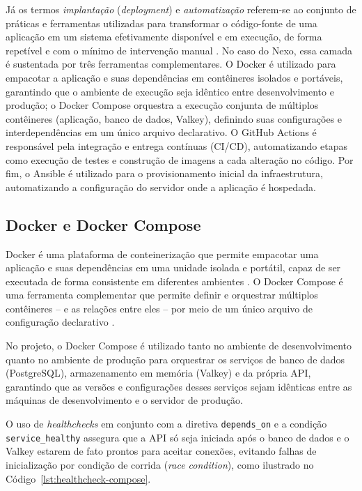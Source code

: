 Já os termos \textit{implantação} (\textit{deployment}) e
\textit{automatização} referem-se ao conjunto de práticas e ferramentas
utilizadas para transformar o código-fonte de uma aplicação em um sistema
efetivamente disponível e em execução, de forma repetível e com o mínimo de
intervenção manual \cite{Humble_Farley_2011}. No caso do Nexo, essa camada é
sustentada por três ferramentas complementares. O Docker é utilizado para
empacotar a aplicação e suas dependências em contêineres isolados e portáveis,
garantindo que o ambiente de execução seja idêntico entre desenvolvimento e
produção; o Docker Compose orquestra a execução conjunta de múltiplos
contêineres (aplicação, banco de dados, Valkey), definindo suas configurações e
interdependências em um único arquivo declarativo. O GitHub Actions é
responsável pela integração e entrega contínuas (CI/CD), automatizando
etapas como execução de testes e construção de imagens a cada alteração no
código. Por fim, o Ansible é utilizado para o provisionamento inicial da
infraestrutura, automatizando a configuração do servidor onde a aplicação é
hospedada.

\subsection{Docker e Docker Compose}

Docker é uma plataforma de conteinerização que permite empacotar uma
aplicação e suas dependências em uma unidade isolada e portátil, capaz de ser
executada de forma consistente em diferentes ambientes \citep{docker:2026}. O
Docker Compose é uma ferramenta complementar que permite definir e orquestrar
múltiplos contêineres -- e as relações entre eles -- por meio de um único
arquivo de configuração declarativo \citep{dockercompose:2026}.

No projeto, o Docker Compose é utilizado tanto no ambiente de desenvolvimento
quanto no ambiente de produção para orquestrar os serviços de banco de dados
(PostgreSQL), armazenamento em memória (Valkey) e da própria API, garantindo
que as versões e configurações desses serviços sejam idênticas entre as
máquinas de desenvolvimento e o servidor de produção.

O uso de \textit{healthchecks} em conjunto com a diretiva
\texttt{depends\_on} e a condição \texttt{service\_healthy} assegura
que a API só seja iniciada após o banco de dados e o Valkey estarem de
fato prontos para aceitar conexões, evitando falhas de inicialização
por condição de corrida (\textit{race condition}), como ilustrado no
Código~\ref{lst:healthcheck-compose}.

